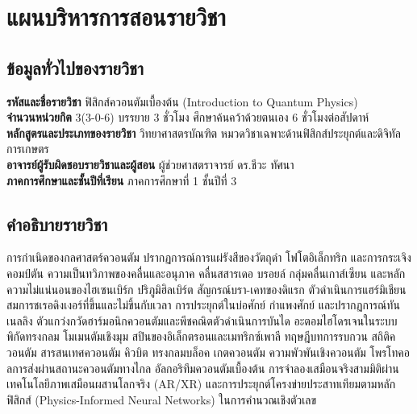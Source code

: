 
\chapter*{แผนบริหารการสอนรายวิชา}

\section*{ข้อมูลทั่วไปของรายวิชา}
\noindent\textbf{รหัสและชื่อรายวิชา} ฟิสิกส์ควอนตัมเบื้องต้น (Introduction to Quantum Physics)\\
\noindent\textbf{จำนวนหน่วยกิต} 3(3-0-6) บรรยาย 3 ชั่วโมง ศึกษาค้นคว้าด้วยตนเอง 6 ชั่วโมงต่อสัปดาห์\\
\noindent\textbf{หลักสูตรและประเภทของรายวิชา} วิทยาศาสตรบัณฑิต หมวดวิชาเฉพาะด้านฟิสิกส์ประยุกต์และดิจิทัลการเกษตร\\
\noindent\textbf{อาจารย์ผู้รับผิดชอบรายวิชาและผู้สอน} ผู้ช่วยศาสตราจารย์ ดร.ชีวะ ทัศนา\\
\noindent\textbf{ภาคการศึกษาและชั้นปีที่เรียน} ภาคการศึกษาที่ 1 ชั้นปีที่ 3

\vspace{10pt}
\section*{คำอธิบายรายวิชา}
การกำเนิดของกลศาสตร์ควอนตัม ปรากฏการณ์การแผ่รังสีของวัตถุดำ โฟโตอิเล็กทริก และการกระเจิงคอมป์ตัน ความเป็นทวิภาพของคลื่นและอนุภาค คลื่นสสารเดอ บรอยล์ กลุ่มคลื่นเกาส์เซียน และหลักความไม่แน่นอนของไฮเซนเบิร์ก ปริภูมิฮิลเบิร์ต สัญกรณ์บรา-เคทของดิแรก ตัวดำเนินการแฮร์มิเชียน สมการชเรอดิงเงอร์ที่ขึ้นและไม่ขึ้นกับเวลา การประยุกต์ในบ่อศักย์ กำแพงศักย์ และปรากฏการณ์ทันเนลลิง ตัวแกว่งกวัดฮาร์มอนิกควอนตัมและพีชคณิตตัวดำเนินการบันได อะตอมไฮโดรเจนในระบบพิกัดทรงกลม โมเมนตัมเชิงมุม สปินของอิเล็กตรอนและเมทริกซ์เพาลี ทฤษฎีบทการรบกวน สถิติควอนตัม สารสนเทศควอนตัม คิวบิต ทรงกลมบล็อค เกตควอนตัม ความพัวพันเชิงควอนตัม โพรโทคอลการส่งผ่านสถานะควอนตัมทางไกล อัลกอริทึมควอนตัมเบื้องต้น การจำลองเสมือนจริงสามมิติผ่านเทคโนโลยีภาพเสมือนผสานโลกจริง (AR/XR) และการประยุกต์โครงข่ายประสาทเทียมตามหลักฟิสิกส์ (Physics-Informed Neural Networks) ในการคำนวณเชิงตัวเลข

\vspace{10pt}
